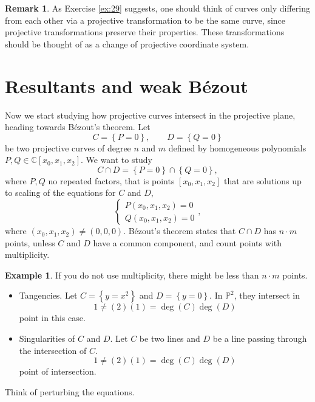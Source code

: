 \documentclass{article}
\newcommand{\C}{\mathbb{C}}
\renewcommand{\P}{\mathbb{P}}
\newcommand{\rb}[1]{\left( #1 \right)}
\renewcommand{\sb}[1]{\left[ #1 \right]}
\newcommand{\cb}[1]{\left\{ #1 \right\}}
\theoremstyle{definition}\newtheorem{definition}{Definition}[section]
\theoremstyle{definition}\newtheorem{notation}[definition]{Notation}
\theoremstyle{definition}\newtheorem{remark}[definition]{Remark}
\theoremstyle{definition}\newtheorem{example1}[definition]{Example}
\theoremstyle{definition}\newtheorem{fact}{Fact}
\theoremstyle{definition}\newtheorem{exercise}{Exercise}
\theoremstyle{definition}\newtheorem*{example2}{Example}
\begin{document}
\begin{remark}
As Exercise \ref{ex:29} suggests, one should think of curves only differing from each other via a projective transformation to be the same curve, since projective transformations preserve their properties. These transformations should be thought of as a change of projective coordinate system.
\end{remark}

\pagebreak


\section{Resultants and weak B\'ezout}

Now we start studying how projective curves intersect in the projective plane, heading towards B\'ezout's theorem. Let
$$ C = \cb{P = 0}, \qquad D = \cb{Q = 0} $$
be two projective curves of degree $ n $ and $ m $ defined by homogeneous polynomials $ P, Q \in \C\sb{x_0, x_1, x_2} $. We want to study
$$ C \cap D = \cb{P = 0} \cap \cb{Q = 0}, $$
where $ P, Q $ no repeated factors, that is points $ \sb{x_0, x_1, x_2} $ that are solutions up to scaling of the equations for $ C $ and $ D $,
$$ \begin{cases}
P\rb{x_0, x_1, x_2} = 0 \\
Q\rb{x_0, x_1, x_2} = 0
\end{cases}, $$
where $ \rb{x_0, x_1, x_2} \ne \rb{0, 0, 0} $. B\'ezout's theorem states that $ C \cap D $ has $ n \cdot m $ points, unless $ C $ and $ D $ have a common component, and count points with multiplicity.

\begin{example2}
If you do not use multiplicity, there might be less than $ n \cdot m $ points.
\begin{itemize}
\item Tangencies. Let $ C = \cb{y = x^2} $ and $ D = \cb{y = 0} $. In $ \P^2 $, they intersect in
$$ 1 \ne \rb{2}\rb{1} = \deg\rb{C}\deg\rb{D} $$
point in this case.
\item Singularities of $ C $ and $ D $. Let $ C $ be two lines and $ D $ be a line passing through the intersection of $ C $.
$$ 1 \ne \rb{2}\rb{1} = \deg\rb{C}\deg\rb{D} $$
point of intersection.
\end{itemize}
Think of perturbing the equations.
\end{example2}
\end{document}
